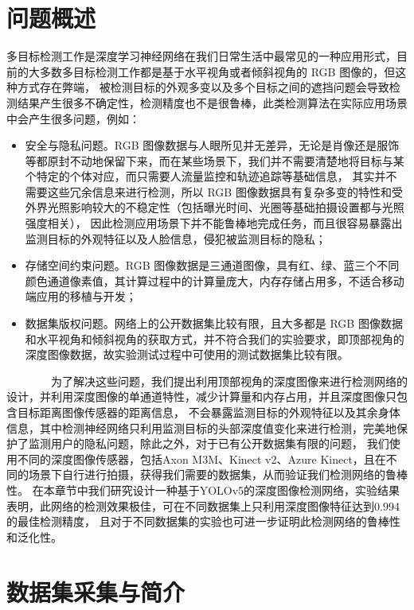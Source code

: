 \section{问题概述}
\label{sec2-1}
多目标检测工作是深度学习神经网络在我们日常生活中最常见的一种应用形式，目前的大多数多目标检测工作都是基于水平视角或者倾斜视角的 RGB 图像的，但这种方式存在弊端，
被检测目标的外观多变以及多个目标之间的遮挡问题会导致检测结果产生很多不确定性，检测精度也不是很鲁棒，此类检测算法在实际应用场景中会产生很多问题，例如：
\begin{itemize}
	\item 安全与隐私问题。RGB 图像数据与人眼所见并无差异，无论是肖像还是服饰等都原封不动地保留下来，而在某些场景下，我们并不需要清楚地将目标与某个特定的个体对应，而只需要人流量监控和轨迹追踪等基础信息，
	其实并不需要这些冗余信息来进行检测，所以 RGB 图像数据具有复杂多变的特性和受外界光照影响较大的不稳定性（包括曝光时间、光圈等基础拍摄设置都与光照强度相关），
	因此检测应用场景下并不能鲁棒地完成任务，而且很容易暴露出监测目标的外观特征以及人脸信息，侵犯被监测目标的隐私；

	\item 存储空间约束问题。RGB 图像数据是三通道图像，具有红、绿、蓝三个不同颜色通道像素值，其计算过程中的计算量庞大，内存存储占用多，不适合移动端应用的移植与开发；

	\item 数据集版权问题。网络上的公开数据集比较有限，且大多都是 RGB 图像数据和水平视角和倾斜视角的获取方式，并不符合我们的实验要求，即顶部视角的深度图像数据，故实验测试过程中可使用的测试数据集比较有限。
	
\end{itemize}
\ \ \ \ \ \ \ \ 为了解决这些问题，我们提出利用顶部视角的深度图像来进行检测网络的设计，并利用深度图像的单通道特性，减少计算量和内存占用，并且深度图像只包含目标距离图像传感器的距离信息，
不会暴露监测目标的外观特征以及其余身体信息，其中检测神经网络只利用监测目标的头部深度值变化来进行检测，完美地保护了监测用户的隐私问题，除此之外，对于已有公开数据集有限的问题，
我们使用不同的深度图像传感器，包括Axon M3M、Kinect v2、Azure Kinect，且在不同的场景下自行进行拍摄，获得我们需要的数据集，从而验证我们检测网络的鲁棒性。
在本章节中我们研究设计一种基于YOLOv5的深度图像检测网络，实验结果表明，此网络的检测效果极佳，可在不同数据集上只利用深度图像特征达到0.994的最佳检测精度，
且对于不同数据集的实验也可进一步证明此检测网络的鲁棒性和泛化性。

\section{数据集采集与简介}
\label{sec2-2}
